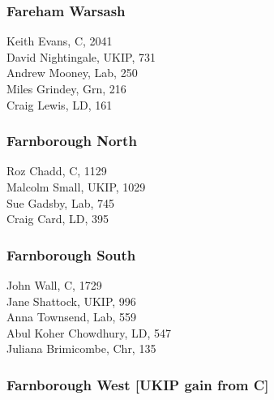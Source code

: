 \documentclass[a4paper,openany,10pt]{book}
\begin{document}
\subsubsection*{Fareham Warsash}



Keith Evans, C, 2041\\
David Nightingale, UKIP, 731\\
Andrew Mooney, Lab, 250\\
Miles Grindey, Grn, 216\\
Craig Lewis, LD, 161\\


\subsubsection*{Farnborough North}



Roz Chadd, C, 1129\\
Malcolm Small, UKIP, 1029\\
Sue Gadsby, Lab, 745\\
Craig Card, LD, 395\\


\subsubsection*{Farnborough South}



John Wall, C, 1729\\
Jane Shattock, UKIP, 996\\
Anna Townsend, Lab, 559\\
Abul Koher Chowdhury, LD, 547\\
Juliana Brimicombe, Chr, 135\\


\subsubsection*{Farnborough West \hspace*{\fill}\nolinebreak[1]%
\enspace\hspace*{\fill}
[UKIP gain from C]}

\end{document}
